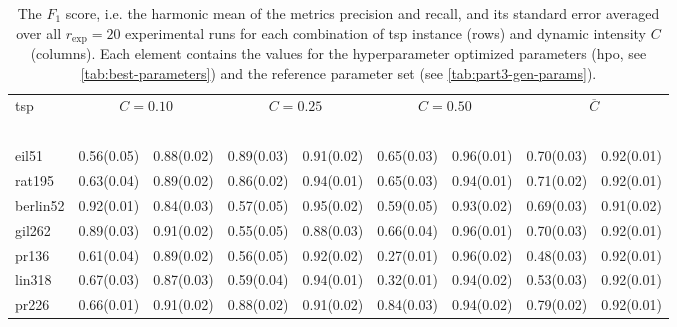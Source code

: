 \begin{table}[h]
	\setlength{\tabcolsep}{5pt}
	\centering
	\caption[The $F_1$ score averaged over all experimental runs for each combination of \gls{tsp} instance and dynamic intensity]{The $F_1$ score, i.e. the harmonic mean of the metrics precision and recall, and its standard error averaged over all $r_\text{exp} = 20$ experimental runs for each combination of \gls{tsp} instance (rows) and dynamic intensity $C$ (columns). Each element contains the values for the hyperparameter optimized parameters (\gls{hpo}, see \ref{tab:best-parameters}) and the reference parameter set (see \ref{tab:part3-gen-params}).}
	\label{tab:detection-stats-f1}
	\begin{adjustbox}{width=1\textwidth}
	\begin{tabular}{l  S[round-precision=2,table-format=1.2(2)] S[round-precision=2,table-format=1.2(2)]  S[round-precision=2,table-format=1.2(2)] S[round-precision=2,table-format=1.2(2)]  S[round-precision=2,table-format=1.2(2)] S[round-precision=2,table-format=1.2(2)]  S[round-precision=2,table-format=1.2(2)] S[round-precision=2,table-format=1.2(2)]}
		\hline
		 \gls{tsp} &  &  &  &  \\ 
		 \cmidrule(lr){2-3} \cmidrule(lr){4-5}  \cmidrule(lr){6-7} \cmidrule(lr){8-9}
		~ &   &  &  &  &  &  &  & \\ \hline
		eil51 & 0.56(0.05) & 0.88(0.02) & 0.89(0.03) & 0.91(0.02) & 0.65(0.03) & 0.96(0.01) &0.70(0.03)& 0.92(0.01)\\
		rat195 & 0.63(0.04) & 0.89(0.02) & 0.86(0.02) & 0.94(0.01)  & 0.65(0.03) & 0.94(0.01) &0.71(0.02)&0.92(0.01)\\ \hline
		berlin52 & 0.92(0.01) &0.84(0.03)& 0.57(0.05) &0.95(0.02)& 0.59(0.05) & 0.93(0.02) &0.69(0.03)& 0.91(0.02)\\
		gil262 & 0.89(0.03) & 0.91(0.02) & 0.55(0.05) & 0.88(0.03)  & 0.66(0.04) &  0.96(0.01) &0.70(0.03)&0.92(0.01)\\ \hline
		pr136 & 0.61(0.04) & 0.89(0.02) & 0.56(0.05) & 0.92(0.02) & 0.27(0.01) & 0.96(0.02)  &0.48(0.03)&0.92(0.01)\\
		lin318 & 0.67(0.03) & 0.87(0.03) & 0.59(0.04) &  0.94(0.01) & 0.32(0.01) & 0.94(0.02)  &0.53(0.03)&0.92(0.01)\\ \hline
		pr226 & 0.66(0.01) & 0.91(0.02) & 0.88(0.02) & 0.91(0.02) & 0.84(0.03) & 0.94(0.02) &0.79(0.02)& 0.92(0.01)\\

\end{tabular}
\end{adjustbox}
\end{table}
